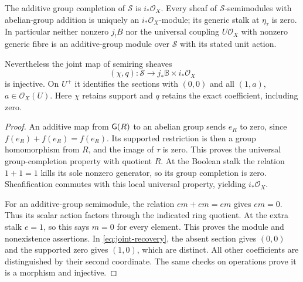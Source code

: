 \begin{theorem}
\label{thm:additive-loss}
The additive group completion of $\mathcal S$ is $i_*\mathcal O_X$.
Every sheaf of $\mathcal S$-semimodules with abelian-group addition is
uniquely an $i_*\mathcal O_X$-module; its generic stalk at
$\eta_\tau$ is zero. In particular neither nonzero $j_!B$ nor the
universal coupling $U\mathcal O_X$ with nonzero generic fibre is an
additive-group module over $\mathcal S$ with its stated unit action.

Nevertheless the joint map of semiring sheaves
\[
 (\chi,q):\mathcal S\longrightarrow j_*\mathbb B\times i_*\mathcal O_X
 \tag{RP18}\label{eq:joint-recovery}
\]
is injective. On $U^+$ it identifies the sections with $(0,0)$ and all
$(1,a)$, $a\in\mathcal O_X(U)$. Here $\chi$ retains support and $q$
retains the exact coefficient, including zero.
\end{theorem}
\begin{proof}
An additive map from $\mathsf G(R)$ to an abelian group sends $e_R$ to zero,
since $f(e_R)+f(e_R)=f(e_R)$. Its supported restriction is then a
group homomorphism from $R$, and the image of $\tau$ is zero. This
proves the universal group-completion property with quotient $R$.
At the Boolean stalk the relation $1+1=1$ kills its sole nonzero
generator, so its group completion is zero. Sheafification commutes
with this local universal property, yielding $i_*\mathcal O_X$.

For an additive-group semimodule, the relation
$e m+e m=e m$ gives $e m=0$. Thus its scalar action factors through
the indicated ring quotient. At the extra stalk $e=1$, so this says
$m=0$ for every element. This proves the module and nonexistence
assertions. In \eqref{eq:joint-recovery}, the absent section gives
$(0,0)$ and the supported zero gives $(1,0)$, which are distinct.
All other coefficients are distinguished by their second coordinate.
The same checks on operations prove it is a morphism and injective.
\end{proof}

